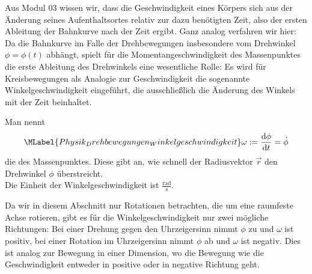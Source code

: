 \begin{MContent}

Aus Modul 03 wissen wir, dass die Geschwindigkeit eines K\"orpers sich aus der \"Anderung seines Aufenthaltsortes relativ zur dazu ben\"otigten Zeit, also der ersten Ableitung der Bahnkurve nach der Zeit ergibt. Ganz analog verfahren wir hier: Da die Bahnkurve im Falle der Drehbewegungen insbesondere vom Drehwinkel $\phi=\phi(t)$ abh\"angt, spielt f\"ur die Momentangeschwindigkeit des Massenpunktes die erste Ableitung des Drehwinkels eine wesentliche Rolle: Es wird f\"ur Kreisbewegungen als Analogie zur Geschwindigkeit die sogenannte Winkelgeschwindigkeit eingef\"uhrt, die ausschlie{\ss}lich die \"Anderung des Winkels mit der Zeit beinhaltet.

\begin{MInfo}
Man nennt
\begin{equation}\MLabel{Physik_Drehbewegungen_Winkelgeschwindigkeit}
\omega:=\frac{\text{d}\phi}{\text{d}t}=\dot{\phi}
\end{equation}die  des Massenpunktes. Diese gibt an, wie schnell der Radiusvektor $\vec{r}$ den Drehwinkel $\phi$ \"uberstreicht.\\
Die Einheit der Winkelgeschwindigkeit ist $\frac{\text{rad}}{s}$.
\end{MInfo}

Da wir in diesem Abschnitt nur Rotationen betrachten, die um eine raumfeste Achse rotieren, gibt es f\"ur die Winkelgeschwindigkeit nur zwei m\"ogliche Richtungen: Bei einer Drehung gegen den Uhrzeigersinn nimmt $\phi$ zu und $\omega$ ist positiv, bei einer Rotation im Uhrzeigersinn nimmt $\phi$ ab und $\omega$ ist negativ. Dies ist analog zur Bewegung in einer Dimension, wo die Bewegung wie die Geschwindigkeit entweder in positive oder in negative Richtung geht. \\


\end{MContent}
